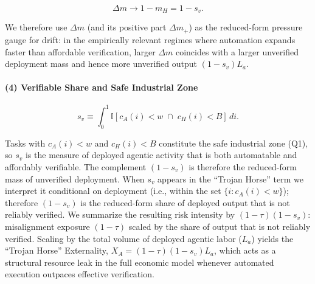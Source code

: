 \documentclass[12pt, letter]{article}
\begin{document}
\begin{equation}
 \Delta m \to 1 - m_H = 1 - s_v.
\end{equation}


We therefore use $\Delta m$ (and its positive part $\Delta m_+$) as the reduced-form pressure gauge for drift: in the empirically relevant regimes where automation expands faster than affordable verification, larger $\Delta m$ coincides with a larger unverified deployment mass and hence more unverified output $(1-s_v)L_a$.



\paragraph{(4) Verifiable Share and Safe Industrial Zone}

\begin{equation}
s_v \equiv \int_0^1 \mathbb{I}\!\left[c_A(i) < w \;\cap\; c_H(i) < B\right]\,di.
\label{eq:sv-core}
\end{equation}

Tasks with $c_A(i) < w$ and $c_H(i) < B$ constitute the safe industrial zone (Q1), so $s_v$ is the measure of deployed agentic activity that is both automatable and affordably verifiable.
The complement $(1-s_v)$ is therefore the reduced-form mass of unverified deployment.
When $s_v$ appears in the ``Trojan Horse'' term we interpret it conditional on deployment (i.e., within the set $\{ i: c_A(i)<w\}$); therefore $(1-s_v)$ is the reduced-form share of deployed output that is not reliably verified.
We summarize the resulting risk intensity by $(1-\tau)(1-s_v)$: misalignment exposure $(1-\tau)$ scaled by the share of output that is not reliably verified.
Scaling by the total volume of deployed agentic labor ($L_a$) yields the ``Trojan Horse'' Externality, $X_A = (1-\tau)(1-s_v)L_a$, which acts as a structural resource leak in the full economic model whenever automated execution outpaces effective verification.

\clearpage
\end{document}
